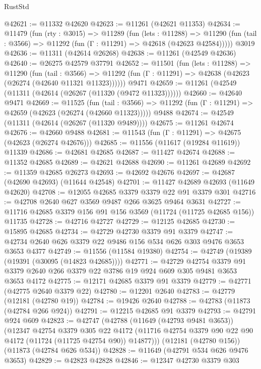 \begin{lexlean}{RustStd}
\begin{coremodule}
@42621 := @11332 @42620
@42623 := @11261 (@42621 @11353)
@42634 := @11479
    (fun (rty : @3015) =>
    @11289
      (fun (lets : @11288) =>
      @11290 (fun (tail : @3566) => @11292 (fun (Γ : @11291) => @42618 (@42623 @42584)))))
    @3019
@42636 := @11311 (@42614 @26268)
@42638 := @11261 (@42549 @42636)
@42640 := @26275 @42579 @37791
@42652 := @11501
    (fun (lets : @11288) =>
    @11290
      (fun (tail : @3566) =>
      @11292 (fun (Γ : @11291) => @42638 (@42623 (@26274 (@42640 @11321 @11323))))))
    @9471
@42659 := @11261 (@42549 (@11311 (@42614 (@26267 (@11320 (@9472 @11323))))))
@42660 := @42640 @9471
@42669 := @11525
    (fun (tail : @3566) => @11292 (fun (Γ : @11291) => @42659 (@42623 (@26274 (@42660 @11323)))))
    @9488
@42674 := @42549 (@11311 (@42614 (@26267 (@11320 @9489))))
@42675 := @11261 @42674
@42676 := @42660 @9488
@42681 := @11543 (fun (Γ : @11291) => @42675 (@42623 (@26274 @42676)))
@42685 := @11556 (@11617 (@19284 @11619)) @11339
@42686 := @42681 @42685
@42687 := @11427 @42674
@42688 := @11352 @42685
@42689 := @42621 @42688
@42690 := @11261 @42689
@42692 := @11359 @42685 @26273
@42693 := @42692 @42676
@42697 := @42687 (@42690 @42693) (@11644 @42548)
@42701 := @11427 @42689 @42693 (@11649 @42620)
@42708 := @12055 @42685 @3379 @3379 @22 @91 @3379 @301
@42716 := @42708 @2640 @627 @3569 @9487 @266 @3625 @9464 @3631
@42727 := @11716 @42685 @3379 @156 @91 @156 @3569 (@11724 (@11725 @42685 @156)) @11735
@42728 := @42716 @42727
@42729 := @12125 @42685
@42730 := @15895 @42685
@42734 := @42729 @42730 @3379 @91 @3379
@42747 := @42734 @2640 @626 @3379 @22 @9486 @156 @534 @626 @303 @9476 @3653 @3653 @4377
@42749 := @11556 (@11584 @19380)
@42754 := @42749 (@19389 (@19391 (@30095 (@14823 @42685))))
@42771 := @42729
    @42754
    @3379
    @91
    @3379
    @2640
    @266
    @3379
    @22
    @3786
    @19
    @924
    @609
    @305
    @9481
    @3653
    @3653
    @4172
@42775 := @12171 @42685 @3379 @91 @3379
@42779 := @42771 (@42775 @2640 @3379 @22)
@42780 := @12201 @2640
@42783 := @42779 (@12181 (@42780 @19))
@42784 := @19426 @2640
@42788 := @42783 (@11873 (@42784 @266 @924))
@42791 := @12215 @42685 @91 @3379
@42793 := @42791 @924 @609
@42823 := @42747
    (@42788
      (@11649 (@42793 @9481 @3653))
      (@12347
        @42754
        @3379
        @305
        @22
        @4172
        (@11716 @42754 @3379 @90 @22 @90 @4172 (@11724 (@11725 @42754 @90)) @14877)))
    (@12181 (@42780 @156))
    (@11873 (@42784 @626 @534))
@42828 := @11649 (@42791 @534 @626 @9476 @3653)
@42829 := @42823 @42828
@42846 := @12347
    @42730
    @3379
    @303

\end{coremodule}
\end{lexlean}
